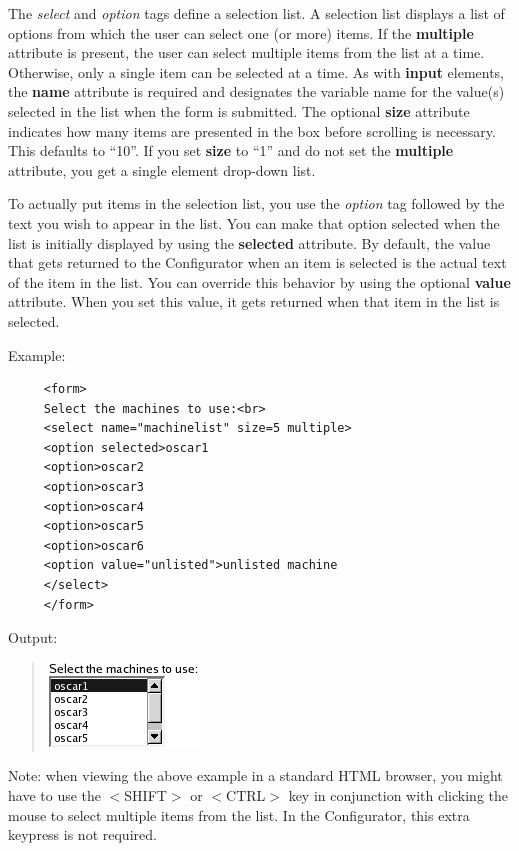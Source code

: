 \begin{itemize}
The \textit{select} and \textit{option} tags define a selection list.
A selection list displays a list of options from which the user can
select one (or more) items. If the \textbf{multiple} attribute is
present, the user can select multiple items from the list at a time.
Otherwise, only a single item can be selected at a time. As with \textbf{input}
elements, the \textbf{name} attribute is required and designates the
variable name for the value(s) selected in the list when the form
is submitted. The optional \textbf{size} attribute indicates how many
items are presented in the box before scrolling is necessary. This
defaults to {}``10''. If you set \textbf{size} to {}``1'' and
do not set the \textbf{multiple} attribute, you get a single element
drop-down list.

To actually put items in the selection list, you use the \textit{option}
tag followed by the text you wish to appear in the list. You can make
that option selected when the list is initially displayed by using
the \textbf{selected} attribute. By default, the value that gets returned
to the Configurator when an item is selected is the actual text of
the item in the list. You can override this behavior by using the
optional \textbf{value} attribute. When you set this value, it gets
returned when that item in the list is selected.

Example:

\begin{footnotesize}
\begin{verbatim}
     <form> 
     Select the machines to use:<br> 
     <select name="machinelist" size=5 multiple> 
     <option selected>oscar1 
     <option>oscar2 
     <option>oscar3 
     <option>oscar4 
     <option>oscar5 
     <option>oscar6 
     <option value="unlisted">unlisted machine 
     </select> 
     </form>
\end{verbatim}
\end{footnotesize}

Output: 

\begin{quote}
\includegraphics[scale=0.5]{figs/SelectMachine}
\end{quote}
Note: when viewing the above example in a standard HTML browser, you
might have to use the $<$SHIFT$>$ or $<$CTRL$>$ key in conjunction with clicking
the mouse to select multiple items from the list. In the Configurator,
this extra keypress is not required.\end{itemize}

